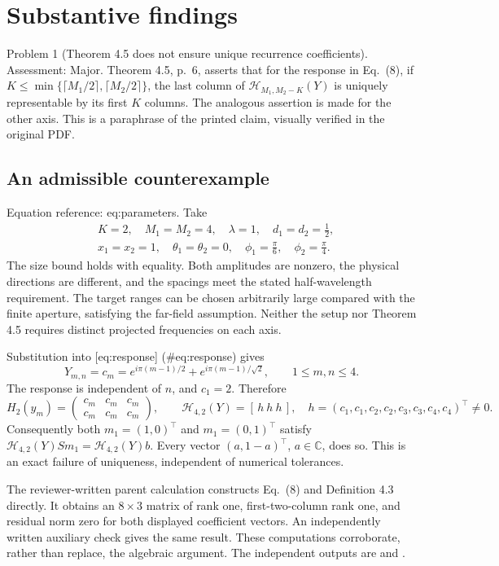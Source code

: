 \documentclass[10pt]{article}
\begin{document}
\section*{Substantive findings}
Problem 1 (Theorem 4.5 does not ensure unique recurrence coefficients).  Assessment: Major. Theorem 4.5, p. 6, asserts that for the response in Eq. (8), if \(K\leq\min\{\lceil M_1/2\rceil,\lceil M_2/2\rceil\}\), the last column of \(\mathcal H_{M_1,M_2-K}(Y)\) is uniquely representable by its first \(K\) columns. The analogous assertion is made for the other axis. This is a paraphrase of the printed claim, visually verified in the original PDF.\par
\subsection*{An admissible counterexample}
Equation reference: eq:parameters. Take \[
\begin{aligned}
&K=2,\quad M_1=M_2=4,\quad \lambda=1,\quad d_1=d_2=\tfrac12,\\
&x_1=x_2=1,\quad \theta_1=\theta_2=0,\quad
\phi_1=\tfrac{\pi}{6},\quad \phi_2=\tfrac{\pi}{4}.
\end{aligned}\] The size bound holds with equality. Both amplitudes are nonzero, the physical directions are different, and the spacings meet the stated half-wavelength requirement. The target ranges can be chosen arbitrarily large compared with the finite aperture, satisfying the far-field assumption. Neither the setup nor Theorem 4.5 requires distinct projected frequencies on each axis.\par
Substitution into [eq:response] (\#eq:response) gives \[Y_{m,n}=c_m
 =e^{i\pi(m-1)/2}+e^{i\pi(m-1)/\sqrt2},
\qquad 1\leq m,n\leq4.\] The response is independent of \(n\), and \(c_1=2\). Therefore \[H_2(y_m)=
\begin{pmatrix}c_m&c_m&c_m\\c_m&c_m&c_m\end{pmatrix},
\qquad
\mathcal H_{4,2}(Y)=[\,h\ h\ h\,],
\quad h=(c_1,c_1,c_2,c_2,c_3,c_3,c_4,c_4)^\top\ne0.\] Consequently both \(m_1=(1,0)^\top\) and \(m_1=(0,1)^\top\) satisfy \(\mathcal H_{4,2}(Y)Sm_1=\mathcal H_{4,2}(Y)b\). Every vector \((a,1-a)^\top\), \(a\in\mathbb C\), does so. This is an exact failure of uniqueness, independent of numerical tolerances.\par
The reviewer-written parent calculation constructs Eq. (8) and Definition 4.3 directly. It obtains an \(8\times3\) matrix of rank one, first-two-column rank one, and residual norm zero for both displayed coefficient vectors. An independently written auxiliary check gives the same result. These computations corroborate, rather than replace, the algebraic argument. The independent outputs are and .\par
\end{document}
